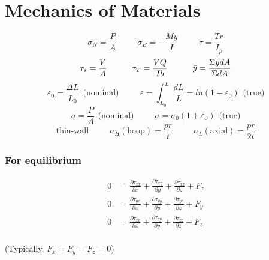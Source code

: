 \documentclass[twocolumn, 12pt]{article}    %
\begin{document}
\footnotesize
\RaggedRight
\section*{Mechanics of Materials}

\begin{equation*}
     \sigma_N=\frac{ P}{A} \hspace{30pt} \sigma_B = -\frac{My}{I}\hspace{30pt} \tau =\frac{Tr}{I_p}
\end{equation*}
\begin{equation*}
    \tau_s = \frac{V}{A} \hspace{30pt} \tau_T = \frac{VQ}{Ib} \hspace{30pt} \Bar{y} = \frac{\Sigma ydA }{\Sigma dA}
\end{equation*}
\begin{equation*}
    \varepsilon_0=\frac{\Delta L}{L_0} \hspace{5pt} \text{(nominal)} \hspace{30pt} \varepsilon = \int_{L_0}^L \frac{dL}{L} = ln(1-\varepsilon_0) \hspace{5pt} \text{(true)}
\end{equation*}
\begin{equation*}
    \sigma = \frac{P}{A} \hspace{5pt} \text{(nominal)} \hspace{30pt} \sigma = \sigma_0(1+\varepsilon_0) \hspace{5pt} \text{(true)}
\end{equation*}
\begin{equation*}
    \text{thin-wall} \hspace{30pt}\sigma_H(\text{hoop})=\frac{pr}{t} \hspace{30pt} \sigma_L(\text{axial})=\frac{pr}{2t}
\end{equation*}
\subsubsection*{For equilibrium}
\begin{align*}
    0 &=  \frac{\partial{\tau_{xx}}}{\partial{x}} +  \frac{\partial{
    \tau_{xy}}}{\partial{y}} +  \frac{\partial{\tau_{xz}}}{\partial{z}} + F_z\\
    0 &=  \frac{\partial{\tau_{yx}}}{\partial{x}} +  \frac{\partial{
    \tau_{yy}}}{\partial{y}} +  \frac{\partial{\tau_{yz}}}{\partial{z}} + F_y\\
    0 &=  \frac{\partial{\tau_{zx}}}{\partial{x}} +  \frac{\partial{
    \tau_{zy}}}{\partial{y}} +  \frac{\partial{\tau_{zz}}}{\partial{z}} + F_z\\
\end{align*}
\begin{center}
    (Typically, \(F_x=F_y=F_z=0\))
\end{center}
\end{document}
